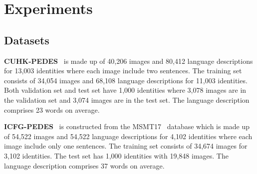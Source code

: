 \section{Experiments}

\subsection{Datasets}
\textbf{CUHK-PEDES}~\cite{li2017person} is made up of 40,206 images and 80,412 language descriptions for 13,003 identities where each image include two sentences. The training set consists of 34,054 images and 68,108 language descriptions for 11,003 identities. Both validation set and test set have 1,000 identities where 3,078 images are in the validation set and 3,074 images are in the test set. The language description comprises 23 words on average.

\textbf{ICFG-PEDES}~\cite{ssan} is constructed from the MSMT17~\cite{MSMT17} database which is made up of 54,522 images and 54,522 language descriptions for 4,102 identities where each image include only one sentences.
The training set consists of 34,674 images for 3,102 identities. The test set has 1,000 identities with 19,848 images.
The language description comprises 37 words on average.

\renewcommand{\multirowsetup}{\centering}
\begin{table*}[t]
\renewcommand\arraystretch{1.06}
    \caption{ \small{The component analysis of \ourmodel. Local means adding $K$ convolution layer to extract local textual feature. SGTL and VGKT are our proposed Semantic-Group Textual Learning Module and Vision-guided Knowledge Transfer Module, respectively.}}\label{tab:ablation}
    \vspace{-2mm}
\footnotesize
    \begin{center}
\end{center}


\end{table*}
